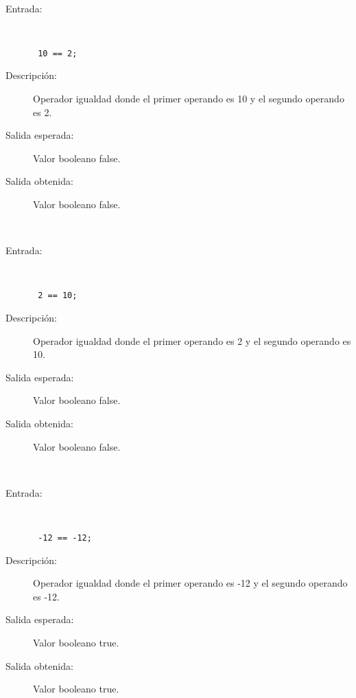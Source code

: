 \hfil \\
	\begin{description}
		\item [Entrada:] \hfill \\
\begin{lstlisting}
 10 == 2;
\end{lstlisting}
		\item [Descripción:] Operador igualdad donde el primer operando es 10 y el segundo operando es  2.
		\item [Salida esperada:] Valor booleano false.
		\item [Salida obtenida:] Valor booleano false.
	\end{description}
\hfil \\
	\begin{description}
		\item [Entrada:] \hfill \\
\begin{lstlisting}
 2 == 10;
\end{lstlisting}
		\item [Descripción:] Operador igualdad donde el primer operando es 2 y el segundo operando es  10.
		\item [Salida esperada:] Valor booleano false.
		\item [Salida obtenida:] Valor booleano false.
	\end{description}
\hfil \\
	\begin{description}
		\item [Entrada:] \hfill \\
\begin{lstlisting}
 -12 == -12;
\end{lstlisting}
		\item [Descripción:] Operador igualdad donde el primer operando es -12 y el segundo operando es  -12.
		\item [Salida esperada:] Valor booleano true.
		\item [Salida obtenida:] Valor booleano true.
	\end{description}
\hfil \\
